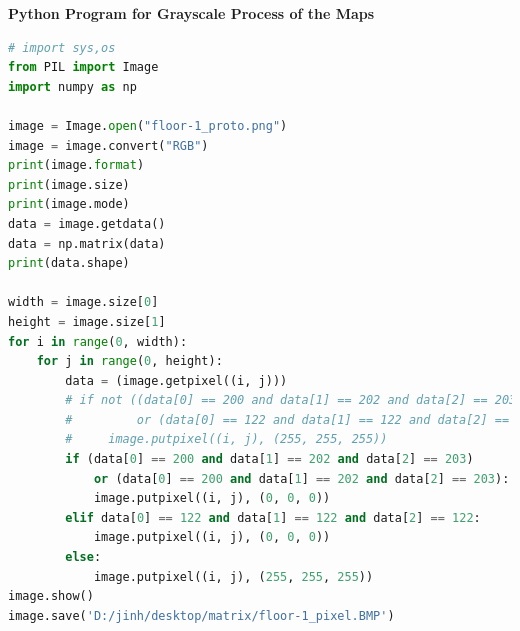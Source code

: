 \documentclass{mcmthesis}
\begin{document}
\noindent\textbf{\Large{Python Program for Grayscale Process of the Maps}}
\lstset{
basicstyle=\sffamily,
keywordstyle=\bfseries,
commentstyle=\rmfamily\itshape,
stringstyle=\ttfamily,
flexiblecolumns,
numbers=left,
numberstyle=\footnotesize}
\begin{lstlisting}[language=Python]
# import sys,os
from PIL import Image
import numpy as np

image = Image.open("floor-1_proto.png")  
image = image.convert("RGB")
print(image.format)  
print(image.size)  
print(image.mode)  
data = image.getdata()
data = np.matrix(data)
print(data.shape)

width = image.size[0]
height = image.size[1]
for i in range(0, width):
    for j in range(0, height):
        data = (image.getpixel((i, j)))
        # if not ((data[0] == 200 and data[1] == 202 and data[2] == 203)
        #         or (data[0] == 122 and data[1] == 122 and data[2] == 122)):
        #     image.putpixel((i, j), (255, 255, 255))
        if (data[0] == 200 and data[1] == 202 and data[2] == 203)
            or (data[0] == 200 and data[1] == 202 and data[2] == 203):
            image.putpixel((i, j), (0, 0, 0))
        elif data[0] == 122 and data[1] == 122 and data[2] == 122:
            image.putpixel((i, j), (0, 0, 0))
        else:
            image.putpixel((i, j), (255, 255, 255))
image.show()
image.save('D:/jinh/desktop/matrix/floor-1_pixel.BMP')
\end{lstlisting}
\end{document}

